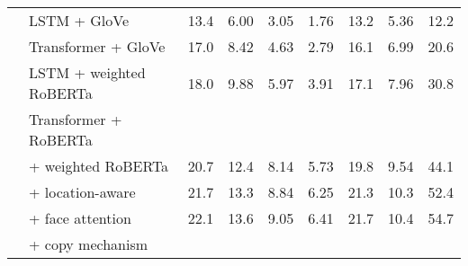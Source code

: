 \begin{table*}[p]
\begin{tabularx}{\textwidth}{llXXXXXXX}
      & LSTM + GloVe & 13.4 & 6.00 & 3.05 & 1.76 & 13.2 & 5.36 & 12.2 \\ %
      & Transformer + GloVe & 17.0 & 8.42 & 4.63 & 2.79 & 16.1 & 6.99 & 20.6 \\ %
      & LSTM + weighted RoBERTa & 18.0 & 9.88 & 5.97 & 3.91 & 17.1 & 7.96 & 30.8 \\ %
      \cmidrule{2-9}
      & Transformer + RoBERTa \\
      & \quad + weighted RoBERTa & 20.7 & 12.4 & 8.14 & 5.73 & 19.8 & 9.54 & 44.1 \\ %
      & \quad\quad + location-aware & 21.7 & 13.3 & 8.84 & 6.25 & 21.3 & 10.3 & 52.4 \\ %
      & \quad\quad\quad + face attention & 22.1 & 13.6 & 9.05 & 6.41 & 21.7 & 10.4 & 54.7 \\ %
      & \quad\quad\quad\quad + copy mechanism \\
      \bottomrule
	\end{tabularx}
\end{table*}



